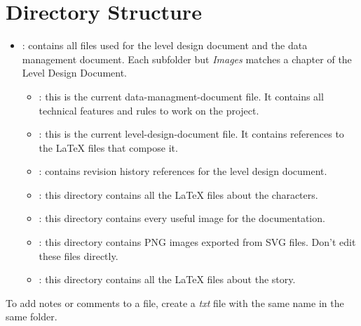 \documentclass[12pt]{article}
\begin{document}
\section{Directory Structure}
\begin{itemize}
\item \textbf{}: contains all files used for the level design document and the data management document. Each subfolder but \textit{Images} matches a chapter of the Level Design Document.
  \begin{itemize}
    \item \textbf{}: this is the current data-managment-document file. It contains all technical features and rules to work on the project.

    \item \textbf{}: this is the current level-design-document file. It contains references to the LaTeX files that compose it.

    \item \textbf{}: contains revision history references for the level design document.

    \item \textbf{}: this directory contains all the LaTeX files about the characters.

    \item \textbf{}: this directory contains every useful image for the documentation.

    \item \textbf{}: this directory contains PNG images exported from SVG files. Don't edit these files directly.

    \item \textbf{}: this directory contains all the LaTeX files about the story.
  \end{itemize}
\end{itemize}

To add notes or comments to a file, create a \textit{txt} file with the same name in the same folder.
\end{document}
